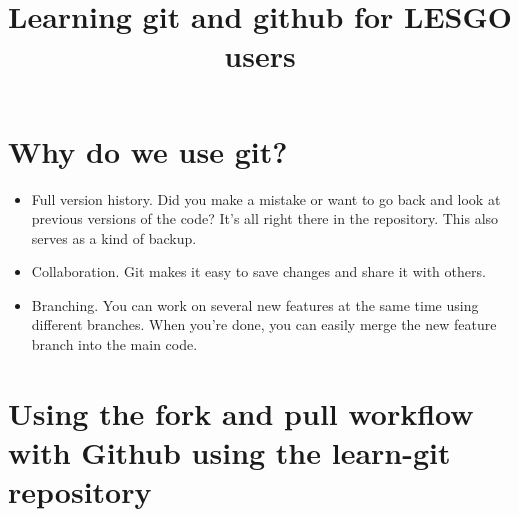\documentclass{article}
\begin{document}
\title{Learning git and github for LESGO users}
\date{}

\maketitle

\section{Why do we use git?}
\begin{itemize}
\item Full version history. Did you make a mistake or want to go back and look at previous versions of the code? It's all right there in the repository. This also serves as a kind of backup.
\item Collaboration. Git makes it easy to save changes and share it with others. 
\item Branching. You can work on several new features at the same time using different branches. When you're done, you can easily merge the new feature branch into the main code.
\end{itemize}

\section{Using the fork and pull workflow with Github using the learn-git repository}
\end{document}
